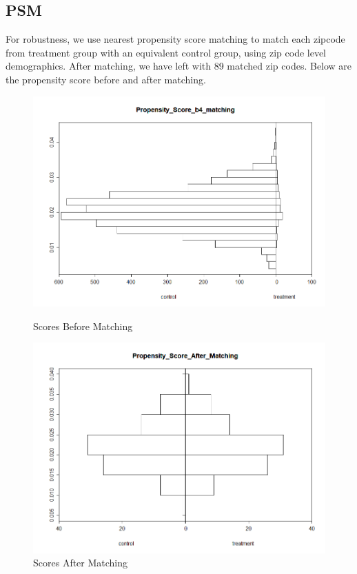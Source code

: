 \documentclass{article}
\begin{document}
\subsection{PSM}
For robustness, we use nearest propensity score matching to match each zipcode from treatment group with an equivalent control group, using zip code level demographics. After matching, we have left with 89 matched zip codes. Below are the propensity score before and after matching.

\begin{figure}[h]
	\centering
	\begin{minipage}{0.45\textwidth}
		\centering
		\includegraphics[width=\textwidth]{pic/b4matching.png}
		\caption{Scores Before Matching}
		\label{fig:b4matching}
	\end{minipage}
	\hfill
	\begin{minipage}{0.45\textwidth}
		\centering
		\includegraphics[width=\textwidth]{pic/Aftermatching.png}
		\caption{Scores After Matching}
		\label{fig:aftermatching}
	\end{minipage}
\end{figure}
\end{document}
